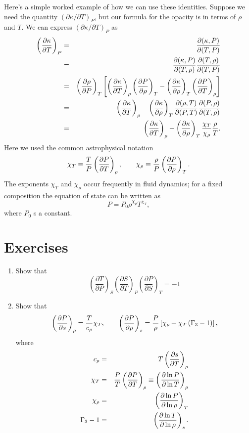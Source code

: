 Here's a simple worked example of how we can use these identities.  Suppose we need the quantity $(\partial \kappa/\partial T)_{P}$, but our formula for the opacity is in terms of $\rho$ and $T$. We can express $(\partial\kappa/\partial T)_{P}$ as
\begin{eqnarray}
\left(\frac{\partial \kappa}{\partial T}\right)_{P} &=& \frac{\partial(\kappa,P)}{\partial(T,P)}\nonumber\\
 &=& \frac{\partial(\kappa,P)}{\partial(T,\rho)}\frac{\partial(T,\rho)}{\partial(T,P)}\nonumber\\
 &=& \left(\frac{\partial \rho}{\partial P}\right)_{T}\left[\left(\frac{\partial \kappa}{\partial T}\right)_{\rho}\left(\frac{\partial P}{\partial \rho}\right)_{T}-\left(\frac{\partial \kappa}{\partial \rho}\right)_{T}\left(\frac{\partial P}{\partial T}\right)_{\rho}\right]
 \nonumber\\
 &=& \left(\frac{\partial \kappa}{\partial T}\right)_{\rho} - \left(\frac{\partial \kappa}{\partial \rho}\right)_{T}\frac{\partial(\rho,T)}{\partial(P,T)}\frac{\partial(P,\rho)}{\partial(T,\rho)}\nonumber\\
 &=& \left(\frac{\partial \kappa}{\partial T}\right)_{\rho} - \left(\frac{\partial \kappa}{\partial \rho}\right)_{T} \frac{\chi_{T}}{\chi_{\rho}}\frac{\rho}{T}.
\end{eqnarray}
Here we used the common astrophysical notation
\begin{equation}
\chi_{T}\equiv\frac{T}{P}\left(\frac{\partial P}{\partial T}\right)_{\rho},\qquad\chi_{\rho}\equiv\frac{\rho}{P}\left(\frac{\partial P}{\partial \rho}\right)_{T}.
\end{equation}
The exponents $\chi_{T}$ and $\chi_{\rho}$ occur frequently in fluid dynamics; for a fixed composition the equation of state can be written as
\begin{equation}\label{e.eos}
P = P_{0}\rho^{\chi_{\rho}}T^{\chi_{T}},
\end{equation}
where $P_{0}$ s a constant.

\section{Exercises}\label{s.thermo-exercises}
\begin{enumerate}
\item Show that 
\[
 	\left(\frac{\partial T}{\partial P}\right)_{S} 
 	\left(\frac{\partial S}{\partial T}\right)_{P} 
 	\left(\frac{\partial P}{\partial S}\right)_{T} = -1
\]

\item Show that
\[ \left(\frac{\partial P}{\partial s}\right)_{\rho} = \frac{T}{c_{\rho}}\chi_{T},\qquad \left(\frac{\partial P}{\partial \rho}\right)_{s} = \frac{P}{\rho}\left[\chi_{\rho} + \chi_{T}\left(\Gamma_{3}-1\right)\right],
\]
where
\begin{eqnarray*}
c_{\rho} &=& T\left(\frac{\partial s}{\partial T}\right)_{\rho}\\
\chi_{T} &=& \frac{P}{T}\left(\frac{\partial P}{\partial T}\right)_{\rho} \equiv \left(\frac{\partial \ln P}{\partial \ln T}\right)_{\rho}\\
\chi_{\rho} &=& \left(\frac{\partial \ln P}{\partial \ln\rho}\right)_{T}\\
\Gamma_{3} - 1 &=& \left(\frac{\partial \ln T}{\partial \ln\rho}\right)_{s}.
\end{eqnarray*}
\end{enumerate}
